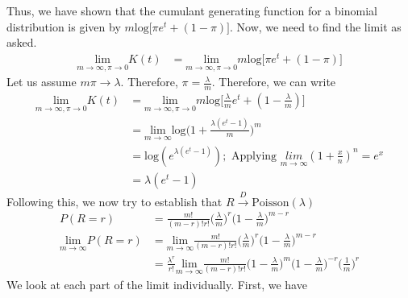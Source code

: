 \documentclass[11pt]{article}
\begin{document}
Thus, we have shown that the cumulant generating function for a binomial distribution is given by $m \text{log} \big[\pi e^{t} + (1 - \pi)\big]$. Now, we need to find the limit as asked.
\begin{equation}
  \nonumber
  \begin{aligned}
    \underset{{m \xrightarrow{} \infty, \pi \xrightarrow{} 0}}{\text{lim}} K(t) & = \underset{{m \xrightarrow{} \infty, \pi \xrightarrow{} 0}}{\text{lim}} m \text{log} \big[\pi e^{t} + (1 - \pi)\big]
  \end{aligned}
\end{equation}
Let us assume $m \pi \xrightarrow{} \lambda$. Therefore, $ \pi = \frac{\lambda}{m}$. Therefore, we can write
\begin{equation}
  \nonumber
  \begin{aligned}
    \underset{{m \xrightarrow{} \infty, \pi \xrightarrow{} 0}}{\text{lim}} K(t) & = \underset{{m \xrightarrow{} \infty, \pi \xrightarrow{} 0}}{\text{lim}} m \text{log} \bigg[\frac{\lambda}{m} e^{t} + (1 - \frac{\lambda}{m})\bigg]\\
    & = \underset{{m \xrightarrow{} \infty}}{\text{lim}}\text{log}\bigg(1 + \frac{\lambda(e^{t} - 1)}{m}\bigg)^{m}\\
    & = \text{log}(e^{\lambda(e^{t} - 1)}); \text{ Applying } \underset{{m \xrightarrow{} \infty}}{lim} (1 + \frac{x}{n})^{n} = e^{x}\\
    & = \lambda(e^{t} - 1)
  \end{aligned}
\end{equation}
Following this, we now try to establish that $R \xrightarrow{D} \text{Poisson}(\lambda)$
\begin{equation}
  \nonumber
  \begin{aligned}
    P(R = r) & = \frac{m!}{(m-r)!r!} \bigg(\frac{\lambda}{m}\bigg)^{r} \bigg(1 - \frac{\lambda}{m}\bigg)^{m-r}\\
    \underset{{m \xrightarrow{} \infty}}{\text{lim}} P(R = r) & = \underset{{m \xrightarrow{} \infty}}{\text{lim}} \frac{m!}{(m-r)!r!} \bigg(\frac{\lambda}{m}\bigg)^{r} \bigg(1 - \frac{\lambda}{m}\bigg)^{m-r}\\
    & = \frac{\lambda^{r}}{r!}\underset{{m \xrightarrow{} \infty}}{\text{lim}}\frac{m!}{(m-r)!r!} \bigg(1 - \frac{\lambda}{m}\bigg)^{m} \bigg(1 - \frac{\lambda}{m}\bigg)^{-r} \bigg(\frac{1}{m}\bigg)^{r}
  \end{aligned}
\end{equation}
We look at each part of the limit individually. First, we have
\end{document}
